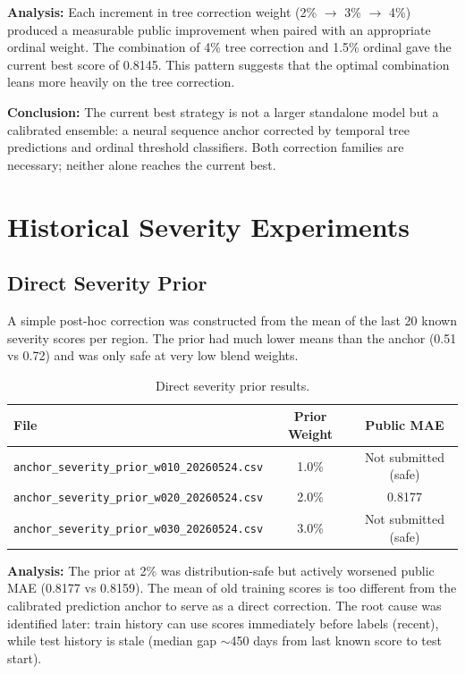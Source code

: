 \documentclass[12pt, a4paper]{article}
\begin{document}
\textbf{Analysis:} Each increment in tree correction weight (2\% $\rightarrow$ 3\% $\rightarrow$ 4\%) produced a measurable public improvement when paired with an appropriate ordinal weight. The combination of 4\% tree correction and 1.5\% ordinal gave the current best score of 0.8145. This pattern suggests that the optimal combination leans more heavily on the tree correction.

\textbf{Conclusion:} The current best strategy is not a larger standalone model but a calibrated ensemble: a neural sequence anchor corrected by temporal tree predictions and ordinal threshold classifiers. Both correction families are necessary; neither alone reaches the current best.

\section{Historical Severity Experiments}

\subsection{Direct Severity Prior}
A simple post-hoc correction was constructed from the mean of the last 20 known severity scores per region. The prior had much lower means than the anchor (0.51 vs 0.72) and was only safe at very low blend weights.

\begin{table}[H]
\centering
\caption{Direct severity prior results.}
\label{tab:prior}
\begin{tabular}{@{}lcc@{}}
\toprule
\textbf{File} & \textbf{Prior Weight} & \textbf{Public MAE} \\
\midrule
\texttt{anchor\_severity\_prior\_w010\_20260524.csv} & 1.0\% & Not submitted (safe) \\
\texttt{anchor\_severity\_prior\_w020\_20260524.csv} & 2.0\% & 0.8177 \\
\texttt{anchor\_severity\_prior\_w030\_20260524.csv} & 3.0\% & Not submitted (safe) \\
\bottomrule
\end{tabular}
\end{table}

\textbf{Analysis:} The prior at 2\% was distribution-safe but actively worsened public MAE (0.8177 vs 0.8159). The mean of old training scores is too different from the calibrated prediction anchor to serve as a direct correction. The root cause was identified later: train history can use scores immediately before labels (recent), while test history is stale (median gap $\sim$450 days from last known score to test start).
\end{document}

